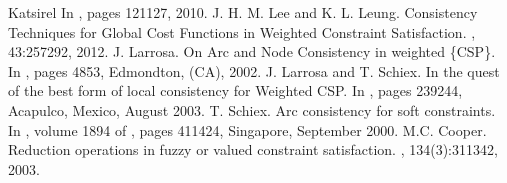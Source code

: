 \documentclass[letterpaper,10pt,openany,oneside,english]{sphinxmanual}
\begin{document}
\begin{sphinxthebibliography}{Katsirel}
In , pages 121\sphinxhyphen{}127, 2010.
\sphinxAtStartPar
J. H. M. Lee and K. L. Leung.
Consistency Techniques for Global Cost Functions in Weighted Constraint Satisfaction.
, 43:257\sphinxhyphen{}292, 2012.
\sphinxAtStartPar
J. Larrosa.
On Arc and Node Consistency in weighted \{CSP\}.
In , pages 48\sphinxhyphen{}53, Edmondton, (CA), 2002.
\sphinxAtStartPar
J. Larrosa and T. Schiex.
In the quest of the best form of local consistency for Weighted CSP.
In , pages 239\sphinxhyphen{}244, Acapulco, Mexico, August 2003.
\sphinxAtStartPar
T. Schiex.
Arc consistency for soft constraints.
In ,
volume 1894 of , pages 411\sphinxhyphen{}424, Singapore, September 2000.
\sphinxAtStartPar
M.C. Cooper.
Reduction operations in fuzzy or valued constraint satisfaction.
, 134(3):311\sphinxhyphen{}342, 2003.
\end{sphinxthebibliography}



\renewcommand{\indexname}{Index}
\printindex
\end{document}
